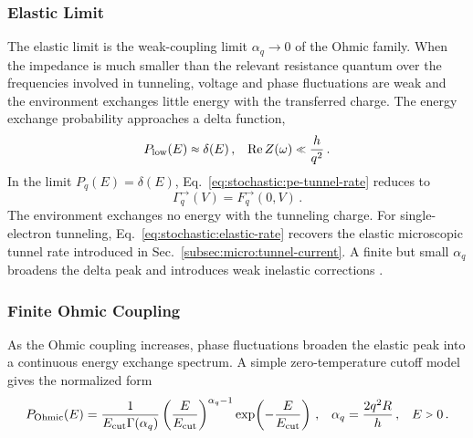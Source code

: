         \subsubsection*{Elastic Limit}
            The elastic limit is the weak-coupling limit $\alpha_q\to0$ of the Ohmic family. When the impedance is much smaller than the relevant resistance quantum over the frequencies involved in tunneling, voltage and phase fluctuations are weak and the environment exchanges little energy with the transferred charge. The energy exchange probability approaches a delta function,
            \begin{align}
                P_\mathrm{low}(E) \sapprox \delta(E)\,, &&
                \mathrm{Re}\,Z(\omega) \sll \frac{h}{q^2}\,.
            \end{align}
            In the limit $P_q(E)=\delta(E)$, Eq.~\eqref{eq:stochastic:pe-tunnel-rate} reduces to
            \begin{equation}
                \Gamma_q^{\rightarrow}(V)=F_q^{\rightarrow}(0,V)\,.
                \label{eq:stochastic:elastic-rate}
            \end{equation}
            The environment exchanges no energy with the tunneling charge. For single-electron tunneling, Eq.~\eqref{eq:stochastic:elastic-rate} recovers the elastic microscopic tunnel rate introduced in Sec.~\ref{subsec:micro:tunnel-current}. A finite but small $\alpha_q$ broadens the delta peak and introduces weak inelastic corrections \cite{ingold_charge_1992}.

        \subsubsection*{Finite Ohmic Coupling}

            As the Ohmic coupling increases, phase fluctuations broaden the elastic peak into a continuous energy exchange spectrum. A simple zero-temperature cutoff model gives the normalized form
            \begin{align}
                P_\mathrm{Ohmic}(E)
                = \frac{1}{E_\mathrm{cut}\Gamma(\alpha_q)}
                \left(\frac{E}{E_\mathrm{cut}}\right)^{\alpha_q-1}
                \exp\!\left(-\frac{E}{E_\mathrm{cut}}\right)\,,&&
                \alpha_q=\frac{2q^2R}{h}\,, &&
                E\sgt{}0\,.
                \label{eq:stochastic:pe-ohmic}
            \end{align}

